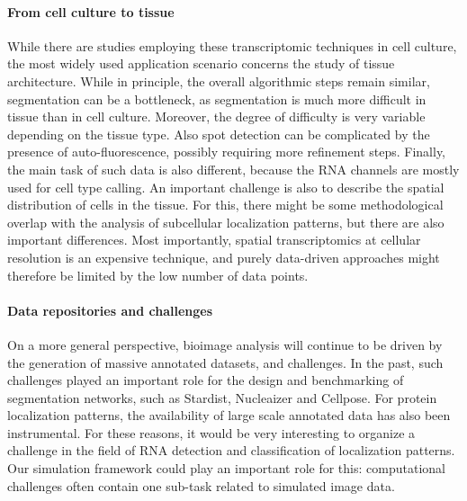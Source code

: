 \paragraph{From cell culture to tissue}
While there are studies employing these transcriptomic techniques in cell culture, the most widely used application scenario concerns the study of tissue architecture. While in principle, the overall algorithmic steps remain similar, segmentation can be a bottleneck, as segmentation is much more difficult in tissue than in cell culture. Moreover, the degree of difficulty is very variable depending on the tissue type. Also spot detection can be complicated by the presence of auto-fluorescence, possibly requiring more refinement steps. Finally, the main task of such data is also different, because the RNA channels are mostly used for cell type calling. An important challenge is also to describe the spatial distribution of cells in the tissue. For this, there might be some methodological overlap with the analysis of subcellular localization patterns, but there are also important differences. Most importantly, spatial transcriptomics at cellular resolution is an expensive technique, and purely data-driven approaches might therefore be limited by the low number of data points. 

\paragraph{Data repositories and challenges}
On a more general perspective, bioimage analysis will continue to be driven by the generation of massive annotated datasets, and challenges. In the past, such challenges played an important role for the design and benchmarking of segmentation networks, such as Stardist, Nucleaizer and Cellpose. For protein localization patterns, the availability of large scale annotated data has also been instrumental. For these reasons, it would be very interesting to organize a challenge in the field of RNA detection and classification of localization patterns. Our simulation framework could play an important role for this: computational challenges often contain one sub-task related to simulated image data. 





